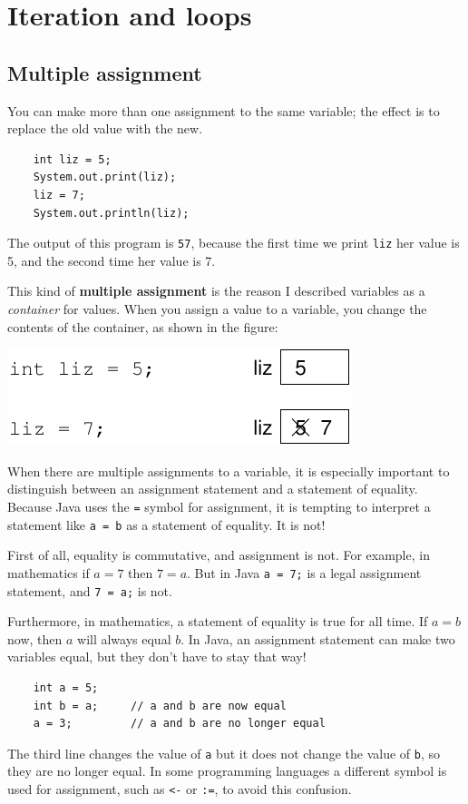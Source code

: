 \chapter{Iteration and loops}
\label{chap06}

\section{Multiple assignment}

You can make more than one assignment to the same variable;
the effect is to replace the old value with the new.

\begin{lstlisting}
    int liz = 5;
    System.out.print(liz);
    liz = 7;
    System.out.println(liz);
\end{lstlisting}
%
The output of this program is {\tt 57}, because the first
time we print {\tt liz} her value is 5, and the second time
her value is 7.

This kind of {\bf multiple assignment} is the reason I
described variables as a {\em container} for values.  When
you assign a value to a variable, you change the contents of
the container, as shown in the figure:


\includegraphics{figs/assign2.pdf}


When there are multiple assignments to a variable, it is especially
important to distinguish between an assignment statement and a
statement of equality.  Because Java uses the {\tt =} symbol for
assignment, it is tempting to interpret a statement like {\tt a = b}
as a statement of equality.  It is not!

First of all, equality is commutative, and assignment is not.
For example, in mathematics if $a = 7$ then $7 = a$.  But in
Java {\tt a = 7;} is a legal assignment statement, and {\tt 7 = a;}
is not.

Furthermore, in mathematics, a statement of equality is true
for all time.  If $a = b$ now, then $a$ will always equal $b$.
In Java, an assignment statement can make two variables equal,
but they don't have to stay that way!

\begin{lstlisting}
    int a = 5;
    int b = a;     // a and b are now equal
    a = 3;         // a and b are no longer equal
\end{lstlisting}
%
The third line changes the value of {\tt a} but it does not
change the value of {\tt b}, so they are no longer equal.
In some programming languages a different symbol is used
for assignment, such as {\tt <-} or {\tt :=}, to
avoid this confusion.

